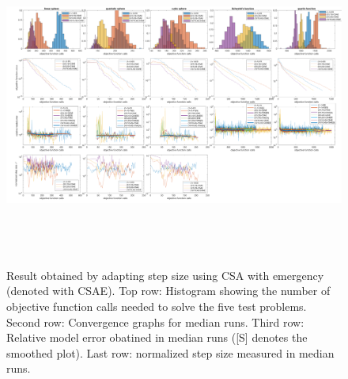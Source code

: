 \begin{center}
\begin{figure}
\includegraphics[height=4.2in, width=6in]{merged_plot_emergency_modified}
\caption{Result obtained by adapting step size using CSA with emergency (denoted with CSAE). Top row: Histogram showing the number of objective function calls needed to solve the five test problems. Second row: Convergence graphs for median runs. Third row: Relative model error obatined in median runs ([S] denotes the smoothed plot). Last row: normalized step size measured in median runs. }
\label{fig:merged_plot_emergency}
\end{figure}
\end{center}


